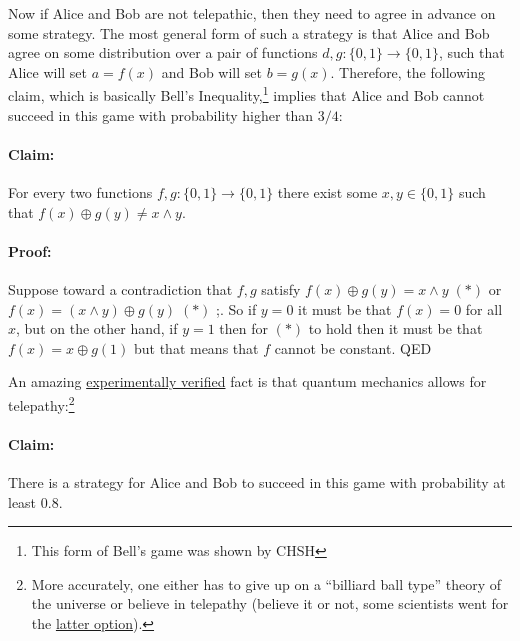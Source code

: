 Now if Alice and Bob are not telepathic, then they need to agree in
advance on some strategy. The most general form of such a strategy is
that Alice and Bob agree on some distribution over a pair of functions
\(d,g:\{0,1\}\rightarrow\{0,1\}\), such that Alice will set \(a=f(x)\)
and Bob will set \(b=g(x)\). Therefore, the following claim, which is
basically Bell's Inequality,\footnote{This form of Bell's game was shown
  by CHSH} implies that Alice and Bob cannot succeed in this game with
probability higher than \(3/4\):

\paragraph{Claim:} For every two functions
\(f,g:\{0,1\}\rightarrow\{0,1\}\) there exist some \(x,y\in\{0,1\}\)
such that \(f(x) \oplus g(y) \neq x \wedge y\).

\paragraph{Proof:} Suppose toward a contradiction that \(f,g\) satisfy
\(f(x) \oplus g(y) = x \wedge y \;(*)\) or
\(f(x) = (x \wedge y) \oplus g(y)\;(*)\) ;. So if \(y=0\) it must be
that \(f(x)=0\) for all \(x\), but on the other hand, if \(y=1\) then
for \((*)\) to hold then it must be that \(f(x) = x \oplus g(1)\) but
that means that \(f\) cannot be constant. QED

An amazing \href{http://arxiv.org/abs/1508.05949}{experimentally
verified} fact is that quantum mechanics allows for telepathy:\footnote{More
  accurately, one either has to give up on a ``billiard ball type''
  theory of the universe or believe in telepathy (believe it or not,
  some scientists went for the
  \href{https://en.wikipedia.org/wiki/Superdeterminism}{latter option}).}

\paragraph{Claim:} There is a strategy for Alice and Bob to succeed in
this game with probability at least \(0.8\).

